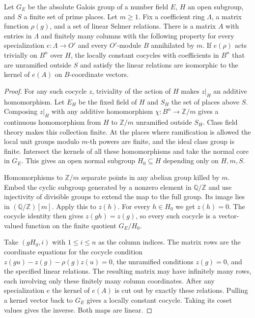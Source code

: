 \begin{lemma}
\label{lem:c-selmer-finite-quotient}
\emitthmsource
Let $G_E$ be the absolute Galois group of a number field $E$, $H$ an open subgroup, and $S$ a finite set of prime places. Let $m\ge1$.
Fix a coefficient ring $\Lambda$, a matrix function $\rho(g)$, and a set of linear Selmer relations.
There is a matrix $A$ with entries in $\Lambda$ and finitely many columns with the following property for every specialization $e:\Lambda\to O'$ and every $O'$-module $B$ annihilated by $m$.
If $e(\rho)$ acts trivially on $B^n$ over $H$, the locally constant cocycles with coefficients in $B^n$ that are unramified outside $S$ and satisfy the linear relations are isomorphic to the kernel of $e(A)$ on $B$-coordinate vectors.
\end{lemma}
\begin{proof}
For any such cocycle $z$, triviality of the action of $H$ makes $z|_H$ an additive homomorphism.
Let $E_H$ be the fixed field of $H$ and $S_H$ the set of places above $S$.
Composing $z|_H$ with any additive homomorphism $\chi:B^n\to\mathbb Z/m$ gives a continuous homomorphism from $H$ to $\mathbb Z/m$ unramified outside $S_H$.
Class field theory makes this collection finite. At the places where ramification is allowed the local unit groups modulo $m$-th powers are finite, and the ideal class group is finite.
Intersect the kernels of all these homomorphisms and take the normal core in $G_E$. This gives an open normal subgroup $H_0\subseteq H$ depending only on $H,m,S$.

Homomorphisms to $\mathbb Z/m$ separate points in any abelian group killed by $m$. Embed the cyclic subgroup generated by a nonzero element in $\mathbb Q/\mathbb Z$ and use injectivity of divisible groups to extend the map to the full group. Its image lies in $(\mathbb Q/\mathbb Z)[m]$.
Apply this to $z(h)$. For every $h\in H_0$ we get $z(h)=0$.
The cocycle identity then gives $z(gh)=z(g)$, so every such cocycle is a vector-valued function on the finite quotient $G_E/H_0$.

Take $(gH_0,i)$ with $1\le i\le n$ as the column indices. The matrix rows are the coordinate equations for the cocycle condition $z(gu)-z(g)-\rho(g)z(u)=0$, the unramified conditions $z(g)=0$, and the specified linear relations.
The resulting matrix may have infinitely many rows, each involving only these finitely many column coordinates.
After any specialization $e$ the kernel of $e(A)$ is cut out by exactly these relations.
Pulling a kernel vector back to $G_E$ gives a locally constant cocycle. Taking its coset values gives the inverse. Both maps are linear.
\end{proof}

